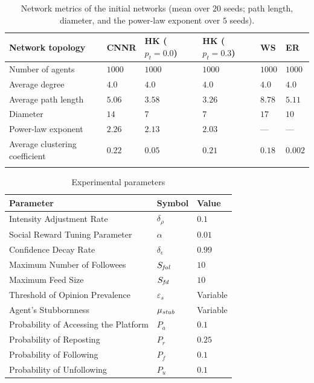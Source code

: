 \documentclass[pdflatex,sn-mathphys-num]{sn-jnl}%
\theoremstyle{thmstyleone}%
\theoremstyle{thmstyletwo}%
\theoremstyle{thmstylethree}%
\def\post{\rho} %
\def\maxfollower{S_{\it fol}}
\def\maxfeed{S_{\it fd}}
\def\Stubbornness{\mu_{\it stub}}
\def\ThofOpPreval{\varepsilon_s}
\begin{document}
\begin{table}[t]
  \tabcolsep=5pt
  \centering
  \caption{Network metrics of the initial networks (mean over
  $20$ seeds; path length, diameter, and the power-law exponent over $5$ seeds).}\label{NWMetrics}
  \begin{tabular}{llllll}
    \toprule
    Network topology & CNNR & HK ($p_t{=}0.0$) & HK ($p_t{=}0.3$) & WS & ER \\
    \midrule
    Number of agents               & $1000$  & $1000$  & $1000$  & $1000$  & $1000$ \\
    Average degree  & $4.0$  & $4.0$  & $4.0$  & $4.0$  & $4.0$  \\
    Average path length      & $5.06$ & $3.58$ & $3.26$ & $8.78$ & $5.11$ \\
    Diameter                 & $14$   & $7$    & $7$    & $17$   & $10$   \\
    Power-law exponent       & $2.26$ & $2.13$ & $2.03$ & ---    & ---    \\
    Average clustering coefficient & $0.22$ & $0.05$ & $0.21$ & $0.18$ & $0.002$ \\
    \bottomrule\\
  \end{tabular}
\end{table}

\begin{table}[t]
  \tabcolsep=5pt
  \centering
  \caption{Experimental parameters}\label{ExpParam}
  \begin{tabular}{lll}
    \toprule
    Parameter & Symbol & Value \\
    \midrule
    Intensity Adjustment Rate & $\delta_\post$ & $0.1$ \\
    Social Reward Tuning Parameter & $\alpha$ & $0.01$ \\
    Confidence Decay Rate & $\delta_\epsilon$ & $0.99$ \\
    Maximum Number of Followees & $\maxfollower$ & $10$\\
    Maximum Feed Size & $\maxfeed$ & $10$\\
    Threshold of Opinion Prevalence & $\ThofOpPreval$ & Variable\\
    Agent's Stubbornness & $\Stubbornness$ & Variable\\
    Probability of Accessing the Platform & $P_a$ & $0.1$\\
    Probability of Reposting & $P_r$ & $0.25$\\
    Probability of Following & $P_f$ & $0.1$\\
    Probability of Unfollowing & $P_u$ & $0.1$\\
    \bottomrule
  \end{tabular}
\end{table}
\end{document}
